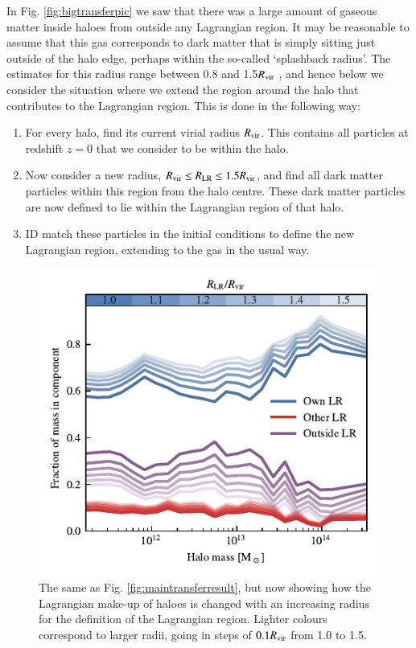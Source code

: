 \documentclass[fleqn,usenatbib]{mnras}
\begin{document}
In Fig. \ref{fig:bigtransferpic} we saw that there was a large amount of
gaseous matter inside haloes from outside any Lagrangian region. It may be
reasonable to assume that this gas corresponds to dark matter that is simply
sitting just outside of the halo edge, perhaps within the so-called
`splashback radius'. The estimates for this radius range between 0.8 and
1.5$R_{\rm vir}$ \citep{More2015, Diemer2017a}, and hence below we consider
the situation where we extend the region around the halo that contributes to
the Lagrangian region. This is done in the following way:
\begin{enumerate}
	\item For every halo, find its current virial radius $R_{\rm vir}$. This contains
	      all particles at redshift $z=0$ that we consider to be within the halo.
    \item Now consider a new radius, $R_{\rm vir} \leq R_{\rm LR} \leq 1.5
		R_{\rm vir}$, and find all dark matter particles within this region
		from the halo centre. These dark matter particles are now defined to
		lie within the Lagrangian region of that halo.
    \item ID match these particles in the initial conditions to define the new
        Lagrangian region, extending to the gas in the usual way.
\end{enumerate}
\begin{figure}
    \centering
    \includegraphics{figures/radius_convergence.pdf}
    \vspace{-0.7cm}
    \caption{The same as Fig. \ref{fig:maintransferresult}, but now showing
    how the Lagrangian make-up of haloes is changed with an increasing radius
    for the definition of the Lagrangian region. Lighter colours correspond
    to larger radii, going in steps of $0.1R_{\rm vir}$ from 1.0 to 1.5.}
    \label{fig:radius_dependence}
\end{figure}
\end{document}
